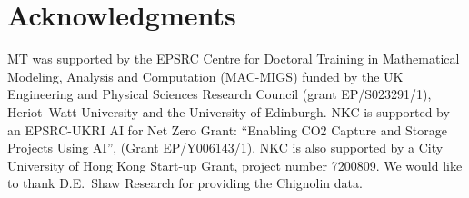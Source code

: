 \documentclass
[
    a4paper,
    DIV=11,
    abstract=true,
    11pt,
]
{scrartcl}
\theoremstyle{definition}
\begin{document}
\section*{Acknowledgments}
MT was supported by the EPSRC Centre for Doctoral Training in Mathematical Modeling, Analysis and Computation (MAC-MIGS) funded by the UK Engineering and Physical Sciences Research Council (grant EP/S023291/1), Heriot--Watt University and the University of Edinburgh. NKC is supported by an EPSRC-UKRI AI for Net Zero Grant: ``Enabling CO2 Capture and Storage Projects Using AI'', (Grant EP/Y006143/1). NKC is also supported by a City University of Hong Kong Start-up Grant, project number 7200809. We would like to thank D.E.\ Shaw Research for providing the Chignolin data.



\end{document}
